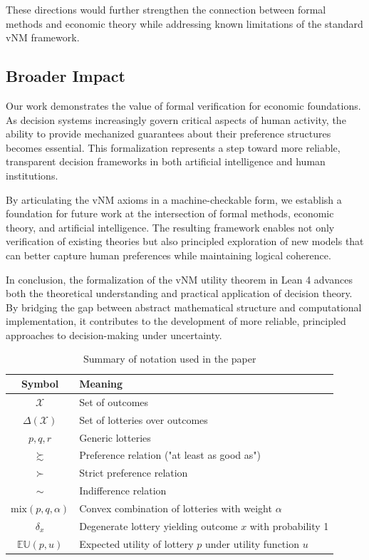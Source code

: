 \documentclass{article}
\theoremstyle{definition}
\newcommand{\X}{\mathcal{X}}
\newcommand{\EU}{\mathbb{EU}}
\newcommand{\DeltaX}{\Delta(\X)} %
\newcommand{\pref}{\succsim} %
\newcommand{\strictpref}{\succ} %
\newcommand{\indiff}{\sim} %
\newcommand{\mix}{\mathrm{mix}} %
\begin{document}
These directions would further strengthen the connection between formal methods and economic theory while addressing known limitations of the standard vNM framework.

\subsection{Broader Impact}

Our work demonstrates the value of formal verification for economic foundations. As decision systems increasingly govern critical aspects of human activity, the ability to provide mechanized guarantees about their preference structures becomes essential. This formalization represents a step toward more reliable, transparent decision frameworks in both artificial intelligence and human institutions.

By articulating the vNM axioms in a machine-checkable form, we establish a foundation for future work at the intersection of formal methods, economic theory, and artificial intelligence. The resulting framework enables not only verification of existing theories but also principled exploration of new models that can better capture human preferences while maintaining logical coherence.

In conclusion, the formalization of the vNM utility theorem in Lean 4 advances both the theoretical understanding and practical application of decision theory. By bridging the gap between abstract mathematical structure and computational implementation, it contributes to the development of more reliable, principled approaches to decision-making under uncertainty.



\begin{table}[h]
\centering
\begin{tabular}{cl}
\toprule
Symbol & Meaning \\
\midrule
$\X$ & Set of outcomes \\
$\DeltaX$ & Set of lotteries over outcomes \\
$p, q, r$ & Generic lotteries \\
$\pref$ & Preference relation ("at least as good as") \\
$\strictpref$ & Strict preference relation \\
$\indiff$ & Indifference relation \\
$\mix(p,q,\alpha)$ & Convex combination of lotteries with weight $\alpha$ \\
$\delta_x$ & Degenerate lottery yielding outcome $x$ with probability 1 \\
$\EU(p,u)$ & Expected utility of lottery $p$ under utility function $u$ \\
\bottomrule
\end{tabular}
\caption{Summary of notation used in the paper}
\label{tab:notation}
\end{table}
\end{document}
